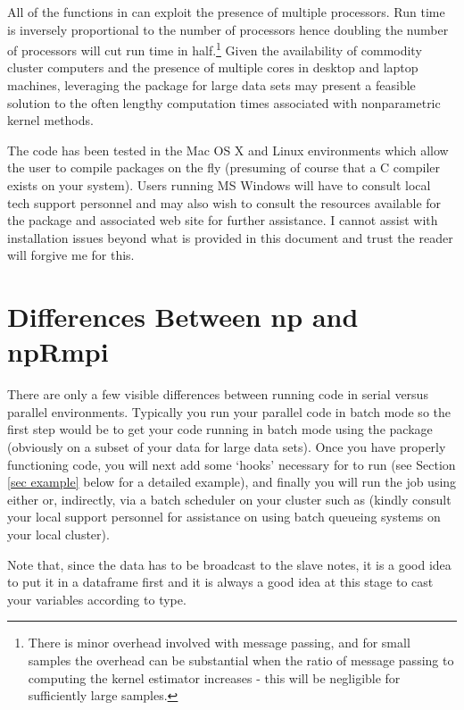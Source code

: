 \documentclass[nojss]{jss}
\begin{document}
All of the functions in  can exploit the presence of multiple
processors. Run time is inversely proportional to the number of
processors hence doubling the number of processors will cut run time
in half.\footnote{There is minor overhead involved with message
  passing, and for small samples the overhead can be substantial when
  the ratio of message passing to computing the kernel estimator
  increases - this will be negligible for sufficiently large samples.}
Given the availability of commodity cluster computers and the presence
of multiple cores in desktop and laptop machines, leveraging the
 package for large data sets may present a feasible
solution to the often lengthy computation times associated with
nonparametric kernel methods.

The code has been tested in the Mac OS X and Linux environments which
allow the user to compile  packages on the fly (presuming
of course that a C compiler exists on your system). Users running MS
Windows will have to consult local tech support personnel and may also
wish to consult the resources available for the  package and
associated web site for further assistance. I cannot assist with
installation issues beyond what is provided in this document and trust
the reader will forgive me for this.

\section{Differences Between np and npRmpi}

There are only a few visible differences between running code in
serial versus parallel environments.  Typically you run your parallel
code in batch mode so the first step would be to get your code running
in batch mode using the  package (obviously on a subset of
your data for large data sets). Once you have properly functioning
code, you will next add some `hooks' necessary for  to
run (see Section \ref{sec example} below for a detailed example), and
finally you will run the job using either  or,
indirectly, via a batch scheduler on your cluster such as 
(kindly consult your local support personnel for assistance on using
batch queueing systems on your local cluster).

Note that, since the data has to be broadcast to the slave notes, it
is a good idea to put it in a dataframe first and it is always a good
idea at this stage to cast your variables according to type.
\end{document}
